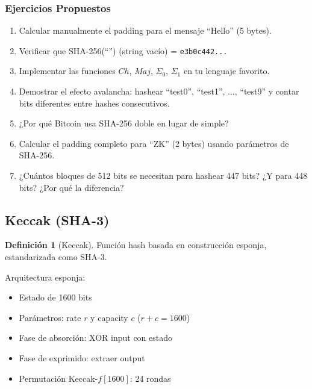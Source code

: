 \documentclass[11pt,a4paper,twoside,openright]{book}
\theoremstyle{definition}
\newtheorem{definition}{Definición}[chapter]
\theoremstyle{plain}
\theoremstyle{remark}
\begin{document}
\subsubsection{Ejercicios Propuestos}

\begin{enumerate}
    \item Calcular manualmente el padding para el mensaje ``Hello'' (5 bytes).
    
    \item Verificar que SHA-256(``'') (string vacío) = \texttt{e3b0c442...}
    
    \item Implementar las funciones $Ch$, $Maj$, $\Sigma_0$, $\Sigma_1$ en tu lenguaje favorito.
    
    \item Demostrar el efecto avalancha: hashear ``test0'', ``test1'', ..., ``test9'' y contar bits diferentes entre hashes consecutivos.
    
    \item ¿Por qué Bitcoin usa SHA-256 doble en lugar de simple?
    
    \item Calcular el padding completo para ``ZK'' (2 bytes) usando parámetros de SHA-256.
    
    \item ¿Cuántos bloques de 512 bits se necesitan para hashear 447 bits? ¿Y para 448 bits? ¿Por qué la diferencia?
\end{enumerate}


\subsection{Keccak (SHA-3)}

\begin{definition}[Keccak]
Función hash basada en construcción esponja, estandarizada como SHA-3.
\end{definition}

Arquitectura esponja:
\begin{itemize}
    \item Estado de 1600 bits
    \item Parámetros: rate $r$ y capacity $c$ ($r + c = 1600$)
    \item Fase de absorción: XOR input con estado
    \item Fase de exprimido: extraer output
    \item Permutación Keccak-$f[1600]$: 24 rondas
\end{itemize}
\end{document}
